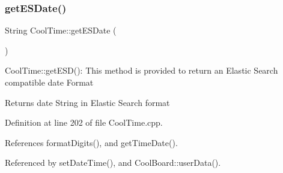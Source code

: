 \subsubsection{\texorpdfstring{get\+E\+S\+Date()}{getESDate()}}
{\footnotesize\ttfamily String Cool\+Time\+::get\+E\+S\+Date (\begin{DoxyParamCaption}{ }\end{DoxyParamCaption})}

Cool\+Time\+::get\+E\+S\+D()\+: This method is provided to return an Elastic Search compatible date Format

\begin{DoxyReturn}{Returns}
date String in Elastic Search format 
\end{DoxyReturn}


Definition at line 202 of file Cool\+Time.\+cpp.



References format\+Digits(), and get\+Time\+Date().



Referenced by set\+Date\+Time(), and Cool\+Board\+::user\+Data().


